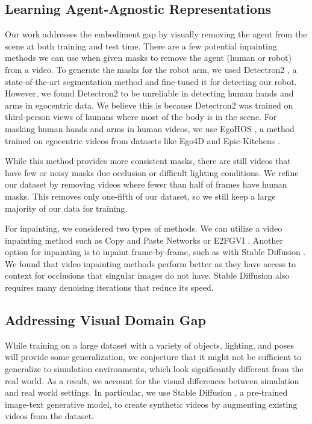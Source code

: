 \subsection{Learning Agent-Agnostic Representations}

Our work addresses the embodiment gap by visually removing the agent from the scene at both training and test time. There are a few potential inpainting methods we can use when given masks to remove the agent (human or robot) from a video. To generate the masks for the robot arm, we used Detectron2 \cite{detectron2}, a state-of-the-art segmentation method and fine-tuned it for detecting our robot. However, we found Detectron2 to be unreliable in detecting human hands and arms in egocentric data. We believe this is because Detectron2 was trained on third-person views of humans where most of the body is in the scene. For masking human hands and arms in human videos, we use EgoHOS \cite{egohos}, a method trained on egocentric videos from datasets like Ego4D \cite{ego4d} and Epic-Kitchens \cite{epickitchens}. 

While this method provides more consistent masks, there are still videos that have few or noisy masks due occlusion or difficult lighting conditions. We refine our dataset by removing videos where fewer than half of frames have human masks. This removes only one-fifth of our dataset, so we still keep a large majority of our data for training.

For inpainting, we considered two types of methods. We can utilize a video inpainting method such as Copy and Paste Networks \cite{cpnetworks} or E2FGVI \cite{e2fgvi}. Another option for inpainting is to inpaint frame-by-frame, such as with Stable Diffusion \cite{stablediffusion}. We found that video inpainting methods perform better as they have access to context for occlusions that singular images do not have. Stable Diffusion also requires many denoising iterations that reduce its speed.

\subsection{Addressing Visual Domain Gap}

While training on a large dataset with a variety of objects, lighting, and poses will provide some generalization, we conjecture that it might not be sufficient to generalize to simulation environments, which look significantly different from the real world. As a result, we account for the visual differences between simulation and real world settings. In particular, we use Stable Diffusion \cite{stablediffusion}, a pre-trained image-text generative model, to create synthetic videos by augmenting existing videos from the dataset.

